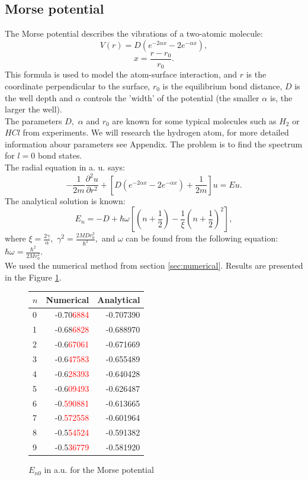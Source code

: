 \documentclass[a4paper, 11pt]{article}
\begin{document}
\subsection{Morse potential}
The Morse potential describes the vibrations of a two-atomic molecule:
\begin{equation}
  V(r) = D(e^{-2\alpha x} - 2e^{-\alpha x}), 
\end{equation}
$$x= \frac{r-r_0}{r_0}.$$
This formula is used to model the atom-surface interaction, and  $r$ is the coordinate perpendicular to the surface, $r_0$ is the equilibrium bond distance, $D$ is the well depth and $\alpha$ controls the 'width' of the potential (the smaller $\alpha$ is, the larger the well). \\
The parameters $D,$ $\alpha$ and $r_0$ are known for some typical molecules such as $H_2$ or $H Cl$ from experiments. We will research the hydrogen atom, for more detailed information abour parameters see Appendix. The problem is to find the spectrum for $l=0$ bond states. \\
The radial equation 
 in a. u.  says:
$$-\frac{1}{2m}\frac{\partial^2 u}{\partial r^2}+[D(e^{-2\alpha x} - 2e^{-\alpha x})+\frac{1}{2m}]u = Eu.$$
The analytical solution is known:
$$E_n = -D + \hbar \omega [(n+\frac{1}{2}) - \frac{1}{\xi}(n+\frac{1}{2})^2],$$
where $\xi = \frac{2 \gamma}{\alpha},$ $\gamma^2 = \frac{2 M D r_0^2}{\hbar^2},$ and $\omega$ can be found from the following equation: $\hbar \omega = \frac{\hbar^2}{2 M  r_0^2}.$\\
We used the numerical method from section \ref{sec:numerical}. Results are presented in the Figure \ref{Mor_spectrum}.
\begin{figure}[h!]
\centering
\begin{tabular}{lrr}
\toprule
$n$ &      Numerical & Analytical \\
\midrule
0 & -0.70\textcolor{red}{6884} & -0.707390 \\
1 & -0.68\textcolor{red}{6828} & -0.688970 \\
2 & -0.6\textcolor{red}{67061} & -0.671669 \\
3 & -0.6\textcolor{red}{47583} & -0.655489 \\
4 & -0.6\textcolor{red}{28393} & -0.640428 \\
5 & -0.6\textcolor{red}{09493} & -0.626487 \\
6 & -0.\textcolor{red}{590881} & -0.613665 \\
7 & -0.\textcolor{red}{572558} & -0.601964 \\
8 & -0.5\textcolor{red}{54524} & -0.591382 \\
9 & -0.5\textcolor{red}{36779} & -0.581920 \\
\bottomrule
\end{tabular}
\caption{$E_{n0}$ in a.u. for the Morse potential}
\label{Mor_spectrum}
\end{figure}
\end{document}
